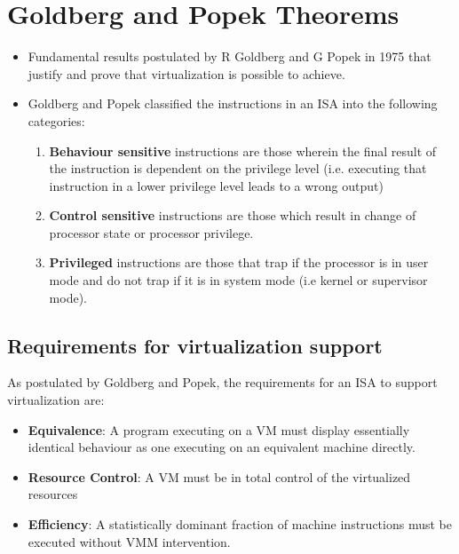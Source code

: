 \documentclass{article}
\begin{document}
\section{Goldberg and Popek Theorems}
\begin{itemize}
    \item Fundamental results postulated by R Goldberg and G Popek in 1975 that justify and prove that virtualization is possible to achieve. 
    
    \item Goldberg and Popek classified the instructions in an ISA into the following categories:
    \begin{enumerate}
        \item \textbf{Behaviour sensitive} instructions are those wherein the final result of the instruction is dependent on the privilege level (i.e. executing that instruction in a lower privilege level leads to a wrong output)
    
        \item \textbf{Control sensitive} instructions are those which result in change of processor state or processor privilege. 
        
        \item \textbf{Privileged} instructions are those that trap if the processor is in user mode and do not trap if it is in system mode (i.e kernel or supervisor mode).
    \end{enumerate}
\end{itemize}

\subsection{Requirements for virtualization support}
As postulated by Goldberg and Popek, the requirements for an ISA to support virtualization are:
\begin{itemize}
    \item \textbf{Equivalence}: A program executing on a VM must display essentially identical behaviour as one executing on an equivalent machine directly.
    
    \item \textbf{Resource Control}: A VM must be in total control of the virtualized resources
    
    \item \textbf{Efficiency}: A statistically dominant fraction of machine instructions must be executed without VMM intervention.
\end{itemize}
\end{document}
